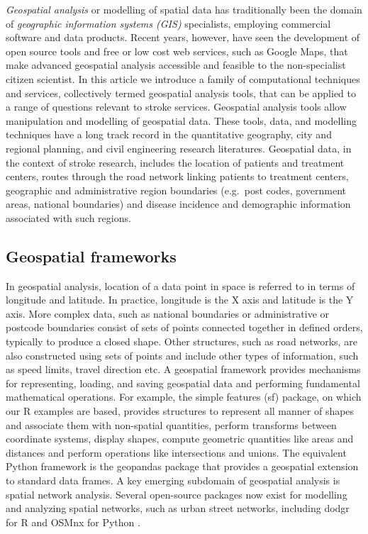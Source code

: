 \documentclass[utf8]{frontiersHLTH}
\begin{document}
{\em Geospatial analysis} or modelling of spatial data has
traditionally been the domain of {\em geographic information systems
  (GIS)} specialists, employing commercial software and data
products. Recent years, however, have seen the development of open
source tools and free or low cost web services, such as Google Maps,
that make advanced geospatial analysis accessible and feasible to the
non-specialist citizen scientist. In this article we introduce a
family of computational techniques and services, collectively termed
geospatial analysis tools, that can be applied to a range of questions
relevant to stroke services. Geospatial analysis tools allow
manipulation and modelling of geospatial data. These tools, data, and
modelling techniques have a long track record in the quantitative
geography, city and regional planning, and civil engineering research
literatures. Geospatial data, in the context of stroke research,
includes the location of patients and treatment centers, routes
through the road network linking patients to treatment centers,
geographic and administrative region boundaries (e.g.~post codes,
government areas, national boundaries) and disease incidence and
demographic information associated with such regions.

\subsection{Geospatial frameworks}\label{geospatial-frameworks} 
In geospatial analysis, location of a data point in space is referred
to in terms of longitude and latitude. In practice, longitude is the X
axis and latitude is the Y axis. More complex data, such as national
boundaries or administrative or postcode boundaries consist of sets of
points connected together in defined orders, typically to produce a
closed shape. Other structures, such as road networks, are also
constructed using sets of points and include other types of
information, such as speed limits, travel direction etc. A geospatial
framework provides mechanisms for representing, loading, and saving
geospatial data and performing fundamental mathematical
operations. For example, the simple features (sf) \cite{Pebesma_2018}
package, on which our R examples are based, provides structures to
represent all manner of shapes and associate them with non-spatial
quantities, perform transforms between coordinate systems, display
shapes, compute geometric quantities like areas and distances and
perform operations like intersections and unions. The equivalent
Python framework is the geopandas package that provides a geospatial
extension to standard data frames. A key emerging subdomain of
geospatial analysis is spatial network analysis. Several open-source
packages now exist for modelling and analyzing spatial networks, such
as urban street networks, including dodgr for R \cite{Padgham_2019}
and OSMnx for Python \cite{boeing_osmnx_2017}.
\end{document}
